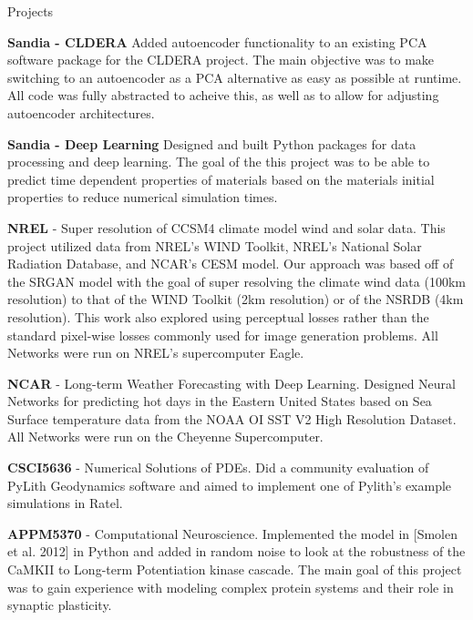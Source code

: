 \documentclass{resume} %
\begin{document}
\fi
\iftrue
\begin{rSection}{Projects}

\setlength \itemsep{-0.4em}
\textbf{Sandia - CLDERA} Added autoencoder functionality to an existing PCA software package for the CLDERA project. The main objective was to make switching to an autoencoder as a PCA alternative as easy as possible at runtime. All code was fully abstracted to acheive this, as well as to allow for adjusting autoencoder architectures.

\textbf{Sandia - Deep Learning} Designed and built Python packages for data processing and deep learning. The goal of the this project was to be able to predict time dependent properties of materials based on the materials initial properties to reduce numerical simulation times.

\textbf{NREL} - Super resolution of CCSM4 climate model wind and solar data. This project utilized data from NREL's WIND Toolkit, NREL's National Solar Radiation Database, and NCAR's CESM model. Our approach was based off of the SRGAN model with the goal of super resolving the climate wind data (100km resolution) to that of the WIND Toolkit (2km resolution) or of the NSRDB (4km resolution). This work also explored using perceptual losses rather than the standard pixel-wise losses commonly used for image generation problems. All Networks were run on NREL's supercomputer Eagle. %

\textbf{NCAR} - Long-term Weather Forecasting with Deep Learning. Designed Neural Networks for predicting hot days in the Eastern United States based on Sea Surface temperature data from the NOAA OI SST V2 High Resolution Dataset. All Networks were run on the Cheyenne Supercomputer.

\textbf{CSCI5636} - Numerical Solutions of PDEs. Did a community evaluation of PyLith Geodynamics software and aimed to implement one of Pylith's example simulations in Ratel.

\textbf{APPM5370} - Computational Neuroscience. Implemented the model in [Smolen et al. 2012] in Python and added in random noise to look at the robustness of the CaMKII to Long-term Potentiation kinase cascade. The main goal of this project was to gain experience with modeling complex protein systems and their role in synaptic plasticity.


\end{rSection}
\end{document}
